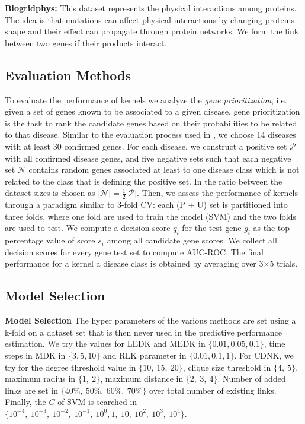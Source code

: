 \documentclass[runningheads,a4paper]{llncs}
\begin{document}
\textbf{Biogridphys:} This dataset represents the physical interactions among proteins. The idea is that mutations can affect physical interactions by changing proteins shape and their effect can propagate through protein networks. We form the link between two genes if their products interact.

\subsection{Evaluation Methods}
To evaluate the performance of kernels we analyze the {\em gene prioritization}, i.e. given a set of genes known to be associated to a given disease, gene prioritization is the task to rank the candidate genes based on their probabilities to be related to that disease. Similar to the evaluation process used in \cite{proceeding3}, we choose 14 diseases with at least 30 confirmed genes. For each disease, we construct a positive set $\mathcal{P}$ with all confirmed disease genes, and five negative sets such that each negative set $\mathcal{N}$ contains random genes associated at least to one disease class which is not related to the class that is defining the positive set. In \cite{proceeding3} the ratio between the dataset sizes is chosen as $\vert \mathcal{N} \vert = \frac{1}{2} \vert \mathcal{P} \vert$. Then, we assess the performance of kernels through a paradigm similar to 3-fold CV: each (P + U) set is partitioned into three folds, where one fold are used to train the model (SVM) and the two folds are used to test. We compute a decision score $q_i$ for the test gene $g_i$ as the top percentage value of score $s_i$ among all candidate gene scores. We collect all decision scores for every gene test set to compute AUC-ROC. The final performance for a kernel a disease class is obtained by averaging over 3$\times$5 trials.
\subsection{Model Selection}
\textbf{Model Selection}
The hyper parameters of the various methods are set using a k-fold on a dataset set that is then never used in the predictive performance estimation. We try the values for LEDK and MEDK in $\lbrace  0.01, 0.05, 0.1 \rbrace$, time steps in MDK in $\lbrace 3, 5, 10 \rbrace$ and RLK parameter in $\lbrace 0.01, 0.1, 1 \rbrace$. For CDNK, we try for the degree threshold value in $\lbrace 10,\ 15,\ 20 \rbrace$, clique size threshold in $\lbrace 4,\ 5 \rbrace$, maximum radius in $\lbrace 1,\ 2 \rbrace$, maximum distance in $\lbrace 2,\ 3,\ 4 \rbrace$. Number of added links are set in $\lbrace 40\%,\ 50\%,\ 60\%,\ 70\% \rbrace$ over total number of existing links. Finally, the $C$ of SVM is searched in $\lbrace 10^{-4},  \ 10^{-3}, \ 10^{-2},\ 10^{-1},\ 10^{0}, 1,\ 10,\ 10^2, \ 10^3,\ 10^4 \rbrace$.
\end{document}

